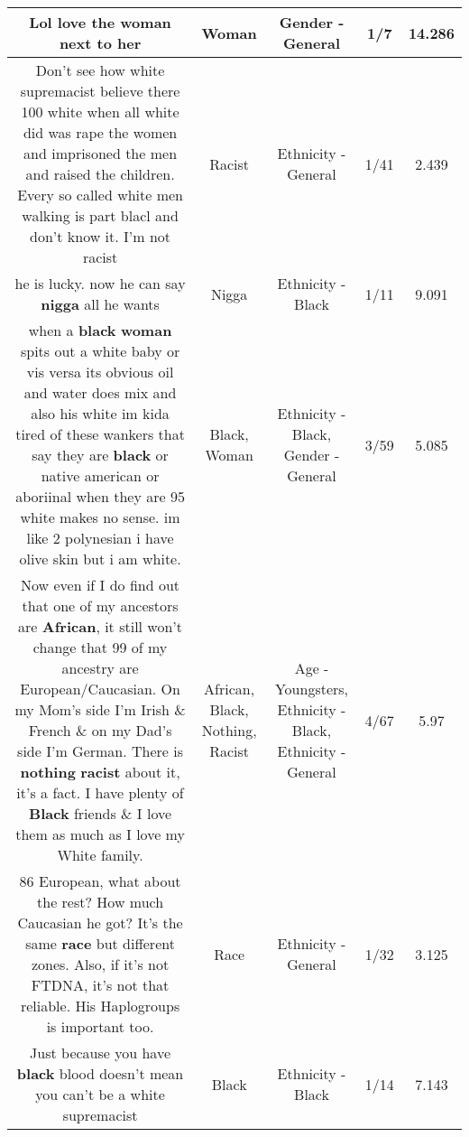 \documentclass[11pt]{article}
\newlength\mylength
\begin{document}
\begin{center}
\begin{longtable}{|C{.65\mylength}|C{.30\mylength}|C{.12\mylength}|C{.12\mylength}|C{.12\mylength}|}
  \small Lol love the \textbf{woman} next to her\normalsize   & Woman & Gender - General & 1/7 & 14.286 \\  \hline
  \small Don't see how white supremacist believe there 100 white when all white did was rape the women and imprisoned the men and raised the children. Every so called white men walking is part blacl and don't know it. I'm not racist\normalsize   & Racist & Ethnicity - General & 1/41 & 2.439 \\  \hline
  \small he is lucky. now he can say \textbf{nigga} all he wants\normalsize   & Nigga & Ethnicity - Black & 1/11 & 9.091 \\  \hline
  \small when a \textbf{black} \textbf{woman} spits out a white baby or vis versa its obvious oil and water does mix and also his white im kida tired of these wankers that say they are \textbf{black} or native american or aboriinal when they are 95 white makes no sense. im like 2 polynesian i have olive skin but i am white.\normalsize   & Black, Woman & Ethnicity - Black, Gender - General & 3/59 & 5.085 \\  \hline
  \small Now even if I do find out that one of my ancestors are \textbf{African}, it still won't change that 99 of my ancestry are European/Caucasian. On my Mom's side I'm Irish \& French \& on my Dad's side I'm German. There is \textbf{nothing} \textbf{racist} about it, it's a fact. I have plenty of \textbf{Black} friends \& I love them as much as I love my White family.\normalsize   & African, Black, Nothing, Racist & Age - Youngsters, Ethnicity - Black, Ethnicity - General & 4/67 & 5.97 \\  \hline
  \small 86 European, what about the rest? How much Caucasian he got? It's the same \textbf{race} but different zones. Also, if it's not FTDNA, it's not that reliable. His Haplogroups is important too.\normalsize   & Race & Ethnicity - General & 1/32 & 3.125 \\  \hline
  \small Just because you have \textbf{black} blood doesn't mean you can't be a white supremacist\normalsize   & Black & Ethnicity - Black & 1/14 & 7.143 \\  \hline

\end{longtable}
\end{center}
\end{document}
